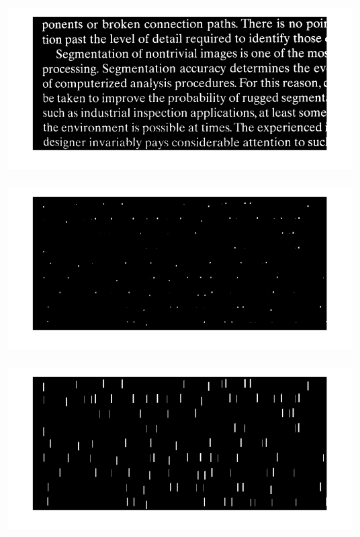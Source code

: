 \begin{figure}[h!]
	\centering
	\begin{subfigure}[b]{0.45\linewidth}
		\includegraphics[width=\linewidth]{myfigure/p8/fig0929(a).png}
		\caption{}
		\label{fig:0929a}
	\end{subfigure}
	\begin{subfigure}[b]{0.45\linewidth}
    	\includegraphics[width=\linewidth]{myfigure/p8/fig0929(b).png}
    	\caption{}
    	\label{fig:0929b}
  	\end{subfigure}
  	\begin{subfigure}[b]{0.45\linewidth}
		\includegraphics[width=\linewidth]{myfigure/p8/fig0929(c).png}
		\caption{}
		\label{fig:0929c}
	\end{subfigure}

\end{figure}
